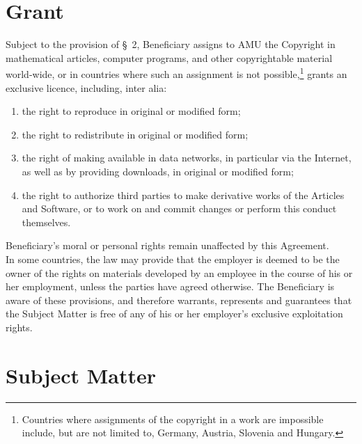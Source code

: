 \section{Grant}
\A Subject to the provision of {\S}~2, Beneficiary assigns to AMU the
Copyright in mathematical articles, computer programs, and other copyrightable material
world-wide, or in countries where such an assignment is not
possible,\footnote{Countries where assignments of the copyright in a
work are impossible include, but are not limited to, Germany, Austria,
Slovenia and Hungary.} grants an exclusive licence, including, inter
alia:
\begin{enumerate}
\item the right to reproduce in original or modified form;
\item the right to redistribute in original or modified form;
\item the right of making available in data networks, in particular
  via the Internet, as well as by providing downloads, in original or
  modified form;
\item the right to authorize third parties to make derivative works of
  the Articles and Software, or to work on and commit changes or perform this
  conduct themselves.
\end{enumerate}
\A Beneficiary's moral or personal rights remain unaffected by this
Agreement.\\ 
\A In some countries, the law may provide that the employer is deemed
to be the owner of the rights on materials developed by an employee in
the course of his or her employment, unless the parties have agreed
otherwise. The Beneficiary is aware of these provisions, and therefore
warrants, represents and guarantees that the Subject Matter is free of
any of his or her employer's exclusive exploitation rights.
\vspace{-0.5cm}
\section{Subject Matter}

